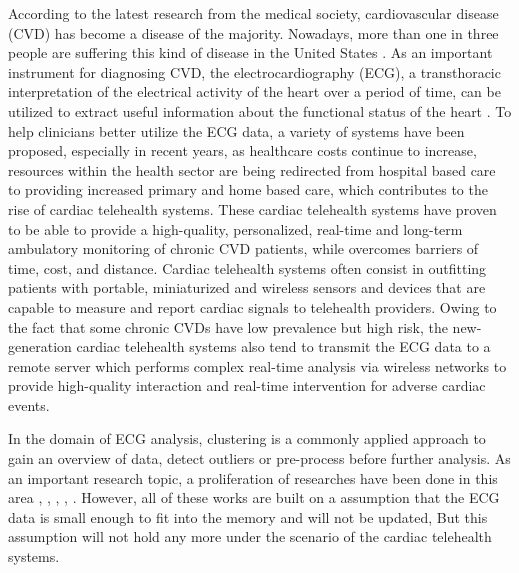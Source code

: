 \documentclass[conference]{IEEEtran}
\begin{document}
According to the latest research from the medical society, cardiovascular disease (CVD) has become a disease of the majority. Nowadays, more than one in three people are suffering this kind of disease in the United States \cite{Roger15122011}. As an important instrument for diagnosing CVD, the electrocardiography (ECG), a transthoracic interpretation of the electrical activity of the heart over a period of time, can be utilized to extract useful information about the functional status of the heart \cite{springerlink:10.1007/978-3-642-15020-3_21}. To help clinicians better utilize the ECG data, a variety of systems have been proposed, especially in recent years, as healthcare costs continue to increase, resources within the health sector are being redirected from hospital based care to providing increased primary and home based care, which contributes to the rise of cardiac telehealth systems\cite{demiris2010role}. These cardiac telehealth systems have proven to be able to provide a high-quality, personalized, real-time and long-term ambulatory monitoring of chronic CVD patients, while overcomes barriers of time, cost, and distance. Cardiac telehealth systems often consist in outfitting patients with portable, miniaturized and wireless sensors and devices that are capable to measure and report cardiac signals to telehealth providers. Owing to the fact that some chronic CVDs have low prevalence but high risk, the new-generation cardiac telehealth systems also tend to transmit the ECG data to a remote server which performs complex real-time analysis via wireless networks to provide high-quality interaction and real-time intervention for adverse cardiac events. 


In the domain of ECG analysis, clustering is a commonly applied approach to gain an overview of data, detect outliers or pre-process before further analysis. As an important research topic, a proliferation of researches have been done in this area \cite{lagerholm2000clustering}, \cite{sufi2011clustering}, \cite{ceylan2009novel}, \cite{bortolan1991ecg}, \cite{bortolan1993diagnostic}. However, all of these works are built on a assumption that the ECG data is small enough to fit into the memory and will not be updated, But this assumption will not hold any more under the scenario of the cardiac telehealth systems.
\end{document}
